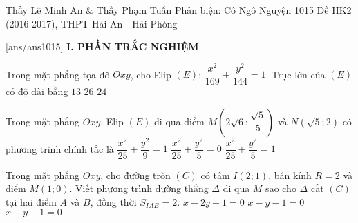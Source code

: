 \begin{name}
{Thầy Lê Minh An \& Thầy Phạm Tuấn
	\newline Phản biện: Cô Ngô Nguyện}
{1015 Đề HK2 (2016-2017), THPT Hải An - Hải Phòng}
\end{name}
	\setcounter{ex}{0}\setcounter{bt}{0}
	[ans/ans1015]
\noindent\textbf{I. PHẦN TRẮC NGHIỆM}
\begin{ex}%
Trong mặt phẳng tọa đô $Oxy$, cho Elip $(E)$: $\dfrac{x^2}{169}+\dfrac{y^2}{144}=1$. Trục lớn của $(E)$ có độ dài bằng
{$13$}
{\True $26$}
{$24$}
\end{ex}

\begin{ex}%
Trong mặt phẳng $Oxy$, Elip $(E)$ đi qua điểm $M\left(2\sqrt{6};\dfrac{\sqrt{5}}{5}\right)$ và $N\left(\sqrt{5};2\right)$ có phương trình chính tắc là
{$\dfrac{x^2}{25}+\dfrac{y^2}{9}=1$}
{$\dfrac{x^2}{25}+\dfrac{y^2}{5}=0$}
{\True $\dfrac{x^2}{25}+\dfrac{y^2}{5}=1$}
\end{ex}

\begin{ex}%
Trong mặt phẳng $Oxy$, cho đường tròn $(C)$ có tâm $I(2;1)$, bán kính $R=2$ và điểm $M(1;0)$. Viết phương trình đường thẳng $\Delta$ đi qua $M$ sao cho $\Delta$ cắt $(C)$ tại hai điểm $A$ và $B$, đồng thời $S_{IAB}=2$.
{$x-2y-1=0$}
{$x-y-1=0$}
{\True $x+y-1=0$}
\end{ex}

